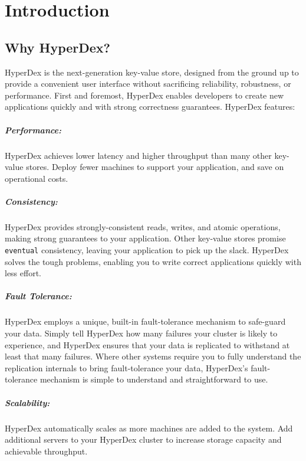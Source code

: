 \chapter{Introduction}

\section{Why HyperDex?}

HyperDex is the next-generation key-value store, designed from the ground up to
provide a convenient user interface without sacrificing reliability, robustness,
or performance.  First and foremost, HyperDex enables developers to create new
applications quickly and with strong correctness guarantees.
HyperDex features:

\paragraph{Performance:}  HyperDex achieves lower latency and higher throughput
than many other key-value stores.  Deploy fewer machines to support your
application, and save on operational costs.

\paragraph{Consistency:}  HyperDex provides strongly-consistent reads, writes,
and atomic operations, making strong guarantees to your application.  Other
key-value stores promise \texttt{eventual} consistency, leaving your application
to pick up the slack.  HyperDex solves the tough problems, enabling you to write
correct applications quickly with less effort.

\paragraph{Fault Tolerance:}  HyperDex employs a unique, built-in
fault-tolerance mechanism to safe-guard your data.  Simply tell HyperDex how
many failures your cluster is likely to experience, and HyperDex ensures that
your data is replicated to withstand at least that many failures.  Where other
systems require you to fully understand the replication internals to bring
fault-tolerance your data, HyperDex's fault-tolerance mechanism is simple to
understand and straightforward to use.

\paragraph{Scalability:}  HyperDex automatically scales as more machines are
added to the system.  Add additional servers to your HyperDex cluster to
increase storage capacity and achievable throughput.

